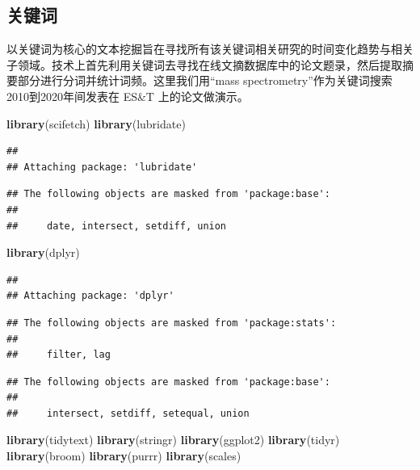 \documentclass[]{tufte-book}
\newenvironment{Shaded}{}{}
\newcommand{\KeywordTok}[1]{\textcolor[rgb]{0.00,0.44,0.13}{\textbf{#1}}}
\newcommand{\NormalTok}[1]{#1}
\begin{document}
\hypertarget{ux5173ux952eux8bcd}{%
\subsection{关键词}\label{ux5173ux952eux8bcd}}

以关键词为核心的文本挖掘旨在寻找所有该关键词相关研究的时间变化趋势与相关子领域。技术上首先利用关键词去寻找在线文摘数据库中的论文题录，然后提取摘要部分进行分词并统计词频。这里我们用``mass spectrometry''作为关键词搜索2010到2020年间发表在 ES\&T 上的论文做演示。

\begin{Shaded}
\begin{Highlighting}[]
\KeywordTok{library}\NormalTok{(scifetch)}
\KeywordTok{library}\NormalTok{(lubridate)}
\end{Highlighting}
\end{Shaded}

\begin{verbatim}
## 
## Attaching package: 'lubridate'
\end{verbatim}

\begin{verbatim}
## The following objects are masked from 'package:base':
## 
##     date, intersect, setdiff, union
\end{verbatim}

\begin{Shaded}
\begin{Highlighting}[]
\KeywordTok{library}\NormalTok{(dplyr)}
\end{Highlighting}
\end{Shaded}

\begin{verbatim}
## 
## Attaching package: 'dplyr'
\end{verbatim}

\begin{verbatim}
## The following objects are masked from 'package:stats':
## 
##     filter, lag
\end{verbatim}

\begin{verbatim}
## The following objects are masked from 'package:base':
## 
##     intersect, setdiff, setequal, union
\end{verbatim}

\begin{Shaded}
\begin{Highlighting}[]
\KeywordTok{library}\NormalTok{(tidytext)}
\KeywordTok{library}\NormalTok{(stringr)}
\KeywordTok{library}\NormalTok{(ggplot2)}
\KeywordTok{library}\NormalTok{(tidyr)}
\KeywordTok{library}\NormalTok{(broom)}
\KeywordTok{library}\NormalTok{(purrr)}
\KeywordTok{library}\NormalTok{(scales)}
\end{Highlighting}
\end{Shaded}
\end{document}

